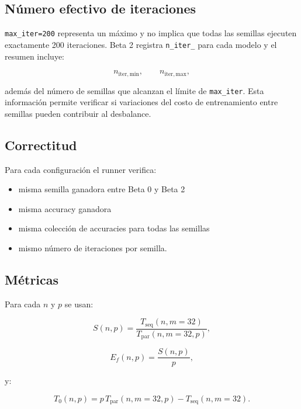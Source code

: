 \documentclass[11pt,a4paper]{article}
\newcommand{\Speedup}{S}
\newcommand{\Efficiency}{E_f}
\begin{document}
\subsection{Número efectivo de iteraciones}

\texttt{max\_iter=200} representa un máximo y no implica que todas las semillas
ejecuten exactamente 200 iteraciones. Beta 2 registra \texttt{n\_iter\_} para cada
modelo y el resumen incluye:

\begin{equation}
    n_{\mathrm{iter,min}},
    \qquad
    n_{\mathrm{iter,max}},
\end{equation}

además del número de semillas que alcanzan el límite de \texttt{max\_iter}. Esta
información permite verificar si variaciones del costo de entrenamiento entre semillas
pueden contribuir al desbalance.

\subsection{Correctitud}

Para cada configuración el runner verifica:

\begin{itemize}[leftmargin=*]
    \item misma semilla ganadora entre Beta 0 y Beta 2
    \item misma accuracy ganadora
    \item misma colección de accuracies para todas las semillas
    \item mismo número de iteraciones por semilla.
\end{itemize}

\subsection{Métricas}

Para cada $n$ y $p$ se usan:

\begin{equation}
    \Speedup(n,p)
    =
    \frac{T_{\mathrm{seq}}(n,m=32)}
         {T_{\mathrm{par}}(n,m=32,p)},
\end{equation}

\begin{equation}
    \Efficiency(n,p)
    =
    \frac{\Speedup(n,p)}{p},
\end{equation}

y:

\begin{equation}
    T_0(n,p)
    =
    p\,T_{\mathrm{par}}(n,m=32,p)
    -
    T_{\mathrm{seq}}(n,m=32).
\end{equation}
\end{document}
